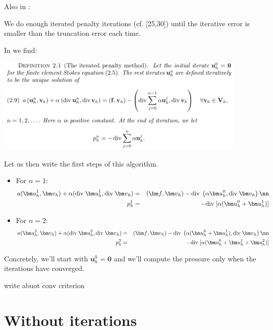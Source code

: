 Also in \cite{huzh11}:
\begin{displayquote}
{\color{darkgray}
We do enough iterated penalty iterations (cf. [25,30]) until the iterative error is smaller
than the truncation error each time.}
\end{displayquote}

In \cite{zhan09} we find:
\begin{center}
\includegraphics[width=12cm]{python_codes/fieldstone_161/images/iterpen}
\end{center}

Let us then write the first steps of this algorithm.
\begin{itemize}
\item
For $n=1$:
\begin{eqnarray}
a({\bm u}_h^1,{\bm v}_h) + \alpha (\text{div}\; {\bm u}_h^1, \text{div}\; {\bm v}_h) 
&=& ({\bm f} , {\bm v}_h) - \text{div}\; \left( \alpha {\bm u}_h^0 , \text{div}\; {\bm v}_h \right) \nn\\
p_h^1 &=& - \text{div}\; [\alpha ( {\bm u}_h^0 + {\bm u}_h^1 )]
\end{eqnarray}
\item 
For $n=2$:
\begin{eqnarray}
a({\bm u}_h^2,{\bm v}_h) + \alpha (\text{div}\; {\bm u}_h^2, \text{div}\; {\bm v}_h) 
&=& ({\bm f} , {\bm v}_h) - \text{div}\; \left( \alpha ({\bm u}_h^0 +{\bm u}_h^1 ), \text{div}\; {\bm v}_h \right) \nn\\
p_h^2 &=& - \text{div}\; [\alpha ( {\bm u}_h^0 + {\bm u}_h^1 + {\bm u}_h^2)]
\end{eqnarray}
\end{itemize}

Concretely, we'll start with ${\bm u}_h^0={\bm 0}$ and we'll compute the pressure only when the 
iterations have converged.

write abuot conv criterion

\newpage
\section*{Without iterations}


